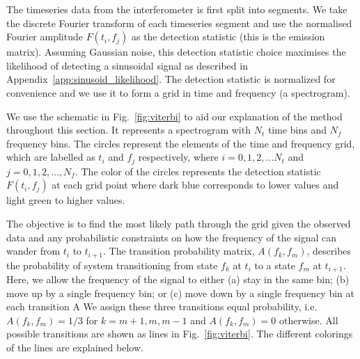 \documentclass[paper-main.tex]{subfiles}
\begin{document}
The timeseries data from the interferometer is first split into segments. 
We take the discrete Fourier transform of each timeseries segment and use the normalised Fourier amplitude $F(t_i,f_j)$ as the detection statistic (this is the emission matrix).
Assuming Gaussian noise, this detection statistic choice maximises the likelihood of detecting a sinusoidal signal as described in Appendix~\ref{app:sinusoid_likelihood}.
The detection statistic is normalized for convenience and we use it to form a grid in time and frequency (a spectrogram). 



We use the schematic in Fig.~\ref{fig:viterbi} to aid our explanation of the method throughout this section. 
It represents a spectrogram with $N_t$ time bins and $N_f$ frequency bins.
The circles represent the elements of the time and frequency grid, which are labelled as  
$t_i$ and $f_j$ respectively, where $i=0,1,2,...N_t$ and $j=0,1,2,...,N_f$. 
The color of the circles represents the detection statistic $F(t_i,f_j)$ at each grid point where dark blue corresponds to lower values and light green to higher values. 




The objective is to find the most likely path through the grid given the observed data and any probabilistic constraints on how the frequency of the signal can wander from $t_i$ to $t_{i+1}$. 
The transition probability matrix, $A(f_k,f_m)$, describes the probability of system transitioning from state $f_k$ at $t_i$ to a state $f_{m}$ at $t_{i+1}$. 
Here, we allow the frequency of the signal to either (a) stay in the same bin; (b) move up by a single frequency bin; or (c) move down by a single frequency bin at each transition A 
We assign these three transitions equal probability, i.e.\ $A(f_k,f_m)=1/3$ for $k=m+1,m,m-1$ and $A(f_k,f_m)=0$ otherwise.
All possible transitions are shown as lines in Fig.~\ref{fig:viterbi}.
The different colorings of the lines are explained below. 
\end{document}
